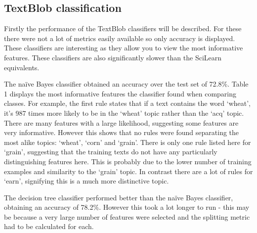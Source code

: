 \documentclass{article}
\begin{document}
\subsection{TextBlob classification}
Firstly the performance of the TextBlob classifiers will be described. For these there were not a lot of metrics easily available so only accuracy is displayed. These classifiers are interesting as they allow you to view the most informative features. These classifiers are also significantly slower than the SciLearn equivalents.

The na{\"i}ve Bayes classifier obtained an accuracy over the test set of 72.8\%. Table 1 displays the most informative features the classifier found when comparing classes. For example, the first rule states that if a text contains the word `wheat', it's 987 times more likely to be in the `wheat' topic rather than the `acq' topic. There are many features with a large likelihood, suggesting some features are very informative. However this shows that no rules were found separating the most alike topics: `wheat', `corn' and `grain'. There is only one rule listed here for `grain', suggesting that the training texts do not have any particularly distinguishing features here. This is probably due to the lower number of training examples and similarity to the `grain' topic. In contrast there are a lot of rules for `earn', signifying this is a much more distinctive topic.

The decision tree classifier performed better than the na{\"i}ve Bayes classifier, obtaining an accuracy of 78.2\%. However this took a lot longer to run - this may be because a very large number of features were selected and the splitting metric had to be calculated for each.
\end{document}
